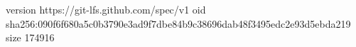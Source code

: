 version https://git-lfs.github.com/spec/v1
oid sha256:090f6f680a5c0b3790e3ad9f7dbe84b9c38696dab48f3495edc2e93d5ebda219
size 174916
